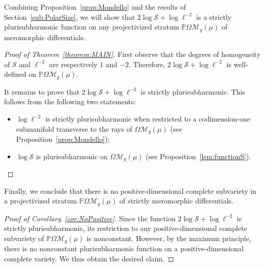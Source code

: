 \documentclass[11]{amsart}
\theoremstyle{plain}
\theoremstyle{definition}
\begin{document}
Combining Proposition~\ref{prop:Mondello} and the results of Section~\ref{sub:PolarSize}, we will show that $2\log \mathcal{S} + \log \ell^{-2}$ is a strictly plurisubharmonic function on any projectivized stratum $\mathbb{P}\Omega\mathcal M_g(\mu)$ of meromorphic differentials. 

\begin{proof}[Proof of Theorem~\ref{theorem:MAIN}]
First observe that the degrees of homogeneity of $\mathcal{S}$ and $\ell^{-2}$ are respectively $1$ and $-2$. Therefore, $2\log \mathcal{S} + \log \ell^{-2}$ is well-defined on $\mathbb{P}\Omega\mathcal M_g(\mu)$.
\par
It remains to prove that $2\log \mathcal{S} + \log \ell^{-2}$ is strictly plurisubharmonic. This follows from the following two statements:
\begin{itemize}
\item $\log \ell^{-2}$ is strictly plurisubharmonic when restricted to a codimension-one submanifold transverse to the rays of $\Omega\mathcal M_g(\mu)$ (see Proposition~\ref{prop:Mondello});
\item $\log \mathcal{S}$ is plurisubharmonic on $\Omega\mathcal M_g(\mu)$ (see Proposition~\ref{lem:functionS}).
\end{itemize} 
\end{proof}

Finally, we conclude that there is no positive-dimensional complete subvariety in a projectivized stratum $\mathbb{P}\Omega\mathcal{M}_{g}(\mu)$ of strictly meromorphic differentials. 

\begin{proof}[Proof of Corollary~\ref{cor:NoPositive}]
Since the function $2\log \mathcal{S} + \log \ell^{-2}$ is strictly plurisubharmonic, its restriction to any positive-dimensional complete subvariety of $\mathbb{P}\Omega\mathcal{M}_{g}(\mu)$ is nonconstant. However, by the maximum principle, there is no nonconstant plurisubharmonic function on a positive-dimensional complete variety. We thus obtain the desired claim. 
\end{proof}

\printbibliography
\end{document}
